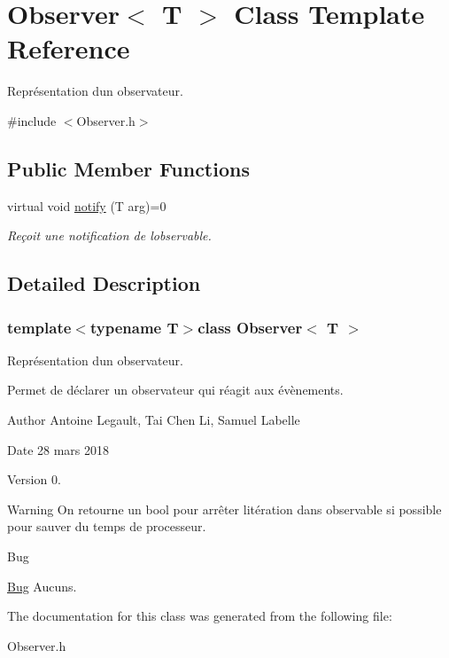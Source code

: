 \hypertarget{class_observer}{}\section{Observer$<$ T $>$ Class Template Reference}
\label{class_observer}


Représentation d\textquotesingle{}un observateur.  




{\ttfamily \#include $<$Observer.\+h$>$}

\subsection*{Public Member Functions}
\begin{DoxyCompactItemize}
\item 
\hypertarget{class_observer_a78133bb6a438c1c111b944e9283dcd07}{}virtual void \hyperlink{class_observer_a78133bb6a438c1c111b944e9283dcd07}{notify} (T arg)=0\label{class_observer_a78133bb6a438c1c111b944e9283dcd07}

\begin{DoxyCompactList}\small\item\em Reçoit une notification de l\textquotesingle{}observable. \end{DoxyCompactList}\end{DoxyCompactItemize}


\subsection{Detailed Description}
\subsubsection*{template$<$typename T$>$class Observer$<$ T $>$}

Représentation d\textquotesingle{}un observateur. 

Permet de déclarer un observateur qui réagit aux évènements. \begin{DoxyAuthor}{Author}
Antoine Legault, Tai Chen Li, Samuel Labelle 
\end{DoxyAuthor}
\begin{DoxyDate}{Date}
28 mars 2018 
\end{DoxyDate}
\begin{DoxyVersion}{Version}
0. 
\end{DoxyVersion}
\begin{DoxyWarning}{Warning}
On retourne un bool pour arrêter l\textquotesingle{}itération dans observable si possible pour sauver du temps de processeur. 
\end{DoxyWarning}
\begin{DoxyRefDesc}{Bug}
\item[\hyperlink{bug__bug000011}{Bug}]Aucuns. \end{DoxyRefDesc}


The documentation for this class was generated from the following file\+:\begin{DoxyCompactItemize}
\item 
Observer.\+h\end{DoxyCompactItemize}
